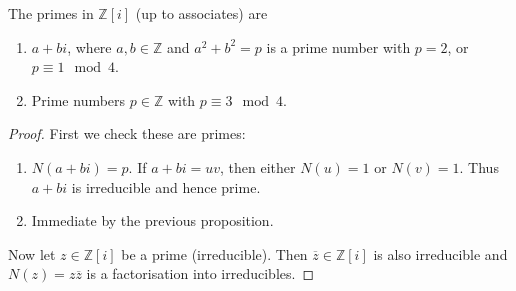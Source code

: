 \documentclass[egregdoesnotlikesansseriftitles,a4paper]{scrartcl}
\begin{document}
\begin{theorem}
       The primes in $\mathbb{Z}[i]$ (up to associates) are
       \begin{enumerate}
             \item $a+bi$, where $a,b \in \mathbb{Z}$ and $a^2+b^2=p$ is a prime number with $p=2$, or $p \equiv 1 \mod 4$.
             \item Prime numbers $p \in \mathbb{Z}$ with $p \equiv 3 \mod 4$. 
       \end{enumerate}
       \begin{proof}
              First we check these are primes:
              \begin{enumerate}
                    \item $N (a+bi)=p$. If $a+bi =uv$, then either $N (u)=1$ or $N (v)=1$. Thus $a+bi$ is irreducible and hence prime.
                    \item Immediate by the previous proposition.
              \end{enumerate}
              Now let $z \in \mathbb{Z}[i]$ be a prime (irreducible). Then $\overline{z} \in \mathbb{Z}[i]$ is also irreducible and $N (z)=z \overline{z}$ is a factorisation into irreducibles.
       \end{proof}
\end{theorem}
\end{document}
